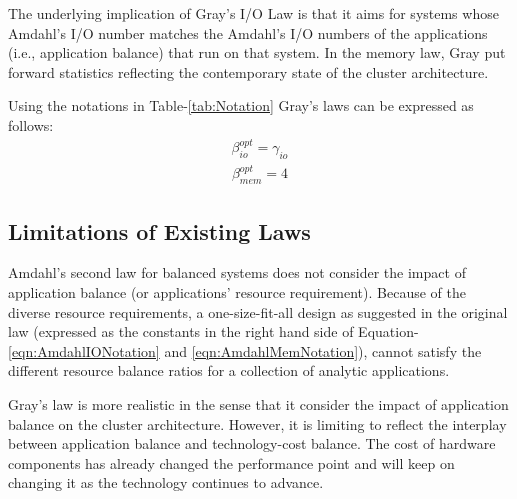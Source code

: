 \documentclass[journal]{IEEEtran}
\begin{document}
The underlying implication of Gray's I/O Law is that it aims for systems whose Amdahl's I/O number  matches the Amdahl's I/O  numbers of the applications (i.e., application balance) that run on that system. In the memory law, Gray put forward statistics reflecting the contemporary state of the cluster architecture. 

Using the notations in Table-\ref{tab:Notation} Gray's laws can be expressed as follows:
\begin{equation} \label{eqn:GrayIONotation}
\begin{split}
\beta_{io}^{opt} = \gamma_{io}
\end{split}
\end{equation}
\begin{equation} \label{eqn:GrayMemNotation}
\begin{split}
\beta_{mem}^{opt} = 4
\end{split}
\end{equation}

\subsection{Limitations of Existing Laws}
Amdahl's second law for balanced systems does not consider the impact of application balance (or applications' resource requirement). Because of the diverse resource requirements, a one-size-fit-all design as suggested in the original law (expressed as the constants in the right hand side of Equation-\ref{eqn:AmdahlIONotation} and \ref{eqn:AmdahlMemNotation}), cannot satisfy the different resource balance ratios for a collection of analytic applications. 

Gray's law is more realistic in the sense that it consider the impact of application balance on the cluster architecture.  However, it is limiting to reflect the interplay between application balance and technology-cost balance. The cost of hardware components has already changed the performance point and will keep on changing it as the technology continues to advance. 
\end{document}
